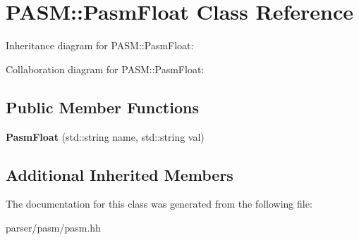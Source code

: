 \hypertarget{classPASM_1_1PasmFloat}{}\section{P\+A\+SM\+:\+:Pasm\+Float Class Reference}
\label{classPASM_1_1PasmFloat}


Inheritance diagram for P\+A\+SM\+:\+:Pasm\+Float\+:


Collaboration diagram for P\+A\+SM\+:\+:Pasm\+Float\+:
\subsection*{Public Member Functions}
\begin{DoxyCompactItemize}
\item 
\mbox{\label{classPASM_1_1PasmFloat_ac744765e5a74f4e9e0b6c5db0b790d12}} 
{\bfseries Pasm\+Float} (std\+::string name, std\+::string val)
\end{DoxyCompactItemize}
\subsection*{Additional Inherited Members}


The documentation for this class was generated from the following file\+:\begin{DoxyCompactItemize}
\item 
parser/pasm/pasm.\+hh\end{DoxyCompactItemize}

